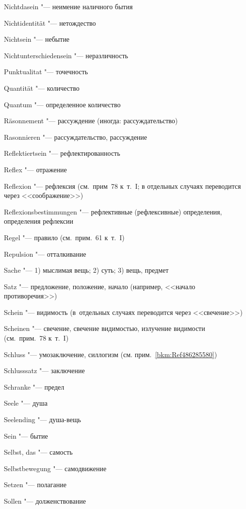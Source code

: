 \begin{multicols}{2}
Nicht\-da\-sein "--- неимение наличного бытия

Nicht\-iden\-tität "--- нетождество

Nicht\-sein "--- небытие

Nicht\-unter\-schieden\-sein "--- неразличность

\bigskip

Punktu\-ali\-tat "--- точечность

\bigskip

Quantität "--- количество

Quantum "--- определенное количество

\bigskip

Räson\-nement "--- рассуждение (иногда: рассуждательство)

Rason\-nieren "--- рассуждательство, рассуждение

Reflek\-tiertsein "--- рефлектированность

Reflex "--- отражение

Reflexion "--- рефлексия (см.~прим~78 к~т.~I; в отдельных случаях
переводится через <<соображение>>)

Re\-flexions\-bestim\-mungen "--- рефлективные (рефлексивные)
определения, определения рефлексии

Regel "--- правило (см.~прим.~61 к~т.~I)

Repul\-sion "--- отталкивание

\bigskip

Sache "--- 1) мыслимая вещь; 2) суть; 3) вещь, предмет

Satz "--- предложение, положение, начало (например, <<начало противоречия>>)

Schein "--- видимость (в~отдельных случаях переводится через <<свечение>>)

Scheinen "--- свечение, свечение видимостью, излучение видимости
(см.~прим.~78 к~т.~I)

Schluss "--- умозаключение, силлогизм (см. прим.~\ref{bkm:Ref486285580})

Schluss\-satz "--- заключение

Schranke "--- предел

Seele "--- душа

Seelending "--- душа-вещь

Sein "--- бытие

Selbst, das "--- самость

Selbst\-bewegung "--- самодвижение

Setzen "--- полагание

Sollen "--- долженствование


\end{multicols}
